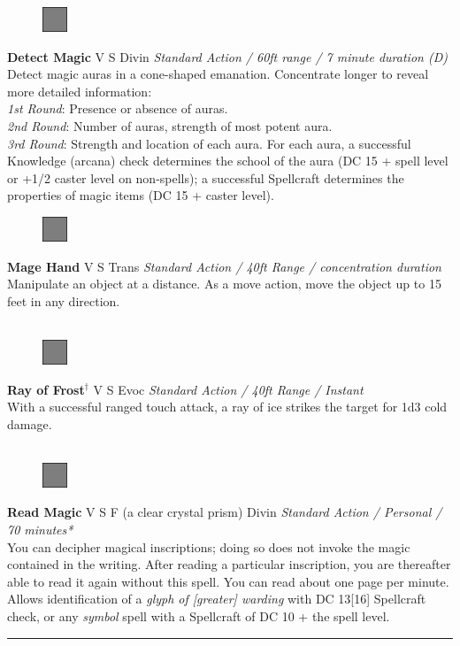 \documentclass[letterpaper]{article}
\newcommand{\e}[1]{\emph{#1}}
\newcommand{\B}[1]{\textbf{#1}}
\newcommand{\D}[0]{$^\dag$}
\newcommand{\spell}[7]{
\begin{figure}
\vspace{-13pt}
\ifstrequal{#2}{Full}{  \includegraphics[width=2em]{Checkbox-Full}}{
\ifstrequal{#2}{Scroll}{\includegraphics[width=2em]{Checkbox-S}}{
                        \includegraphics[width=2em]{Checkbox}}}
\ifstrequal{#7}{}{\vspace{-1em}}{\vspace{#7}}
\end{figure}
 \B{#1} #3 {
    \ifstrequal{#4}{Conj}{\color{Plum}Conj}{%
    \ifstrequal{#4}{Divin}{\color{YellowOrange}Divin}{%
    \ifstrequal{#4}{Ench}{\color{VioletRed}Ench}{%
    \ifstrequal{#4}{Trans}{\color{LimeGreen}Trans}{%
    \ifstrequal{#4}{Evoc}{\color{RedOrange}Evoc}{%
    \ifstrequal{#4}{Illu}{\color{ProcessBlue}Illu}{%
    \ifstrequal{#4}{Abjur}{\color{CadetBlue}Abjur}{%
    \ifstrequal{#4}{Necro}{\color{Red}Necro}{%
}}}}}}}}}
{\footnotesize \e{#5}} \\
#6
}
\begin{document}

\spell{Detect Magic}{Full}{V S}{Divin}{Standard Action / 60ft range / 7 minute duration (D)}{
Detect magic auras in a cone-shaped emanation.  Concentrate longer to reveal more detailed information:\\
\e{1st Round}: Presence or absence of auras.\\
\e{2nd Round}: Number of auras, strength of most potent aura.\\
\e{3rd Round}: Strength and location of each aura.  For each aura, a successful Knowledge (arcana) check determines the school of the aura (DC 15 + spell level or +1/2 caster level on non-spells); a successful Spellcraft determines the properties of magic items (DC 15 + caster level).}{3em} %



\spell{Mage Hand}{Full}{V S}{Trans}{Standard Action / 40ft Range / concentration duration}{%
Manipulate an object at a distance. As a move action, move the object up to 15 feet in any direction.\\}{}\\[-2em] %

\spell{Ray of Frost\D}{Full}{V S}{Evoc}{Standard Action / 40ft Range / Instant}{
With a successful ranged touch attack, a ray of ice strikes the target for 1d3 cold damage.\\}{}\\[-2em] %

\spell{Read Magic}{Full}{V S F (a clear crystal prism)}{Divin}{Standard Action / Personal / 70 minutes*}{
You can decipher magical inscriptions; doing so does not invoke the magic contained in the writing.  After reading a particular inscription, you are thereafter able to read it again without this spell.  You can read about one page per minute. Allows identification of a \e{glyph of [greater] warding} with DC 13[16] Spellcraft check, or any \e{symbol} spell with a Spellcraft of DC 10 + the spell level.}{1em}\\[-1em] %

\hrule\vspace{0.5em}
\end{document}

